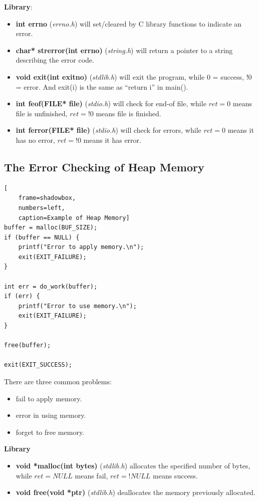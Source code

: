 \documentclass{article}
\begin{document}
\textbf{Library}:

\begin{itemize}
    \item \textbf{int errno} (\textit{errno.h}) will set/cleared by C library functions to indicate an error.
    \item \textbf{char* strerror(int errno)} (\textit{string.h}) will return a pointer to a string describing the error code.
    \item \textbf{void exit(int exitno)} (\textit{stdlib.h}) will exit the program, while $0$ = success, $!0$ = error. And exit(i) is the same as “return i” in main().
    \item \textbf{int feof(FILE* file)} (\textit{stdio.h}) will check for end-of file, while $ret = 0$ means file is unfinished, $ret = !0$ means file is finished.
    \item \textbf{int ferror(FILE* file)} (\textit{stdio.h}) will check for errors, while $ret = 0$ means it has no error, $ret = !0$ means it has error.
\end{itemize}


\subsection{The Error Checking of Heap Memory}

\begin{lstlisting}[
    frame=shadowbox,
    numbers=left,
    caption=Example of Heap Memory]
buffer = malloc(BUF_SIZE);
if (buffer == NULL) {
    printf("Error to apply memory.\n");
    exit(EXIT_FAILURE);
}

int err = do_work(buffer);
if (err) {
    printf("Error to use memory.\n");
    exit(EXIT_FAILURE);
}

free(buffer);

exit(EXIT_SUCCESS);
\end{lstlisting}

There are three common problems:
\begin{itemize}
    \item fail to apply memory.
    \item error in using memory.
    \item forget to free memory.
\end{itemize}

\textbf{Library}

\begin{itemize}
    \item \textbf{void *malloc(int bytes)} (\textit{stdlib.h}) allocates the specified number of bytes, while $ret = NULL$ means fail, $ret = !NULL$ means success.
    \item \textbf{void free(void *ptr)} (\textit{stdlib.h}) deallocates the memory previously allocated.
\end{itemize}
\end{document}
